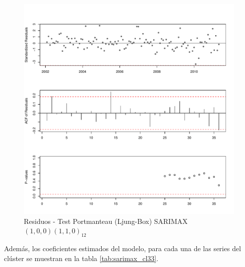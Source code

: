 \documentclass[12pt,oneside]{book}\usepackage[]{graphicx}\usepackage[]{color}
\makeatletter
\def\maxwidth{ %
  \ifdim\Gin@nat@width>\linewidth
    \linewidth
  \else
    \Gin@nat@width
  \fi
}
\newenvironment{knitrout}{}{} %
\theoremstyle{definition} %
\makeatother
\begin{document}
\begin{knitrout}
\color{fgcolor}\begin{figure}[h]

{\centering \includegraphics[width=\maxwidth]{figure/unnamed-chunk-107-1} 

}

\caption[Residuos - Test Portmanteau (Ljung-Box) SARIMAX$(1,0,0)(1,1,0)_{12}$]{Residuos - Test Portmanteau (Ljung-Box) SARIMAX$(1,0,0)(1,1,0)_{12}$}\label{fig:unnamed-chunk-107}
\end{figure}


\end{knitrout}


Además, los coeficientes estimados del modelo, para cada una de las series del clúster se muestran en la tabla \ref{tab:sarimax_cl33}.
\end{document}
